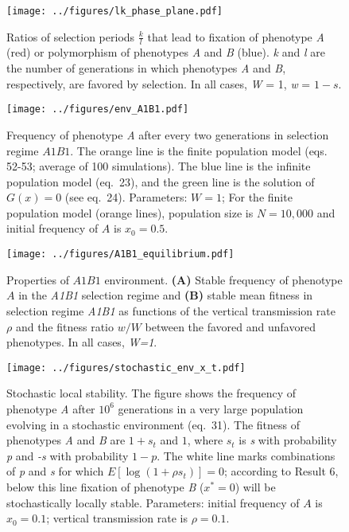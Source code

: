 \documentclass[]{article}
\begin{document}

\begin{figure}
\centering
\texttt{[image: ../figures/lk\_phase\_plane.pdf]}
\caption{Ratios of selection periods \(\frac{k}{l}\) that lead to
fixation of phenotype \emph{A} (red) or polymorphism of phenotypes
\emph{A} and \emph{B} (blue). \emph{k} and \emph{l} are the number of
generations in which phenotypes \emph{A} and \emph{B}, respectively, are favored by selection.
In all cases, \emph{W} = 1, \emph{w} = \(1-s\).}\label{fig:lk_phase_plane}
\end{figure}

\begin{figure}
\centering
\texttt{[image: ../figures/env\_A1B1.pdf]}
\caption{Frequency of phenotype \emph{A} after every two generations in
selection regime \(A1B1\). The orange line is the finite population model
(eqs. 52-53; average of 100 simulations). The blue line is the infinite population model
(eq.\ 23), and the green line is the  solution of \(G(x)=0\) (see eq.\ 24). Parameters: \(W=1\); For the finite population model (orange lines), population size is \(N=10,000\) and initial frequency of \(A\) is \(x_0=0.5\).}\label{fig:env_A1B1}
\end{figure}

\begin{figure}
\centering
\texttt{[image: ../figures/A1B1\_equilibrium.pdf]}
\caption{Properties of $A1B1$ environment.
\textbf{(A)} Stable frequency of phenotype $A$ in the \emph{A1B1} selection regime and \textbf{(B)} stable mean fitness in selection regime \emph{A1B1} as functions of the vertical transmission rate \(\rho\) and the fitness ratio \(w/W\) between the favored and unfavored phenotypes.
In all cases, \emph{W=1}.
}\label{fig:AkBl_equilibrium}
\end{figure}

\begin{figure}
\centering
\texttt{[image: ../figures/stochastic\_env\_x\_t.pdf]}
\caption{Stochastic local stability. The figure shows the frequency of
phenotype \emph{A} after \(10^6\) generations in a very large population 
evolving in a stochastic environment (eq.\ 31). The
fitness of phenotypes \emph{A} and \emph{B} are \(1+s_t\) and \(1\),
where \(s_t\) is \emph{s} with probability \emph{p} and \emph{-s} with
probability \(1-p\). The white line marks combinations of \emph{p}
and \emph{s} for which \(E[\log{(1+\rho s_t)}]=0\); according
to Result 6, below this line fixation of phenotype \emph{B} (\(x^*=0\)) will be
stochastically locally stable. Parameters: initial frequency of \(A\) is \(x_0=0.1\); vertical transmission rate is \(\rho=0.1\).}\label{fig:stochastic_env_x_t}
\end{figure}
\end{document}
